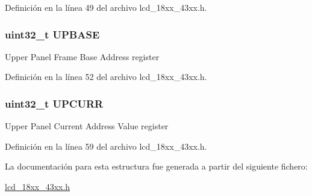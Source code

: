 Definición en la línea 49 del archivo lcd\+\_\+18xx\+\_\+43xx.\+h.

\subsubsection[{\texorpdfstring{U\+P\+B\+A\+SE}{UPBASE}}]{ uint32\+\_\+t U\+P\+B\+A\+SE}\hypertarget{struct_l_p_c___l_c_d___t_aa81e6a99ad0ba1e40cf9fe99d20a97e3}{}\label{struct_l_p_c___l_c_d___t_aa81e6a99ad0ba1e40cf9fe99d20a97e3}
Upper Panel Frame Base Address register 

Definición en la línea 52 del archivo lcd\+\_\+18xx\+\_\+43xx.\+h.

\subsubsection[{\texorpdfstring{U\+P\+C\+U\+RR}{UPCURR}}]{ uint32\+\_\+t U\+P\+C\+U\+RR}\hypertarget{struct_l_p_c___l_c_d___t_abcd5b712b08e138c16317ca4292dc66a}{}\label{struct_l_p_c___l_c_d___t_abcd5b712b08e138c16317ca4292dc66a}
Upper Panel Current Address Value register 

Definición en la línea 59 del archivo lcd\+\_\+18xx\+\_\+43xx.\+h.



La documentación para esta estructura fue generada a partir del siguiente fichero\+:\begin{DoxyCompactItemize}
\item 
\hyperlink{lcd__18xx__43xx_8h}{lcd\+\_\+18xx\+\_\+43xx.\+h}\end{DoxyCompactItemize}
